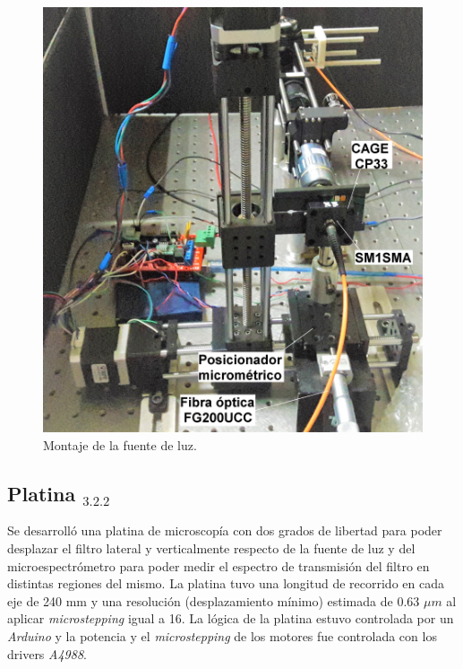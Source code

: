 \begin{figure}[H]
	\centering
	\includegraphics[scale=0.13]{Figs/microespectrometro/setupactualdecote_retoc_condetalles.jpg}
	\caption{Montaje de la fuente de luz.}
	\label{fig:montttluz}
\end{figure}


 


\singlespacing
\subsection{Platina \href{https://github.com/jrr1984/open\_frame\_XYStage}{\faGithub$_{3.2.2}$} \href{https://github.com/jrr1984/open\_frame\_XYStage/tree/master/3dprintedparts/STLs}{\faCubes}}
\label{sec:platina}

\hspace{0.5cm}Se desarrolló una platina de microscopía con dos grados de libertad para poder desplazar el filtro lateral y verticalmente respecto de la fuente de luz y del microespectrómetro para poder medir el espectro de transmisión del filtro en distintas regiones del mismo. La platina tuvo una longitud de recorrido en cada eje de 240 mm y una resolución (desplazamiento mínimo) estimada de 0.63 $\mu m$ al aplicar \textit{microstepping} igual a 16. La lógica de la platina estuvo controlada por un \textit{Arduino} y la potencia y el \textit{microstepping} de los motores fue controlada con los drivers \textit{A4988}.

